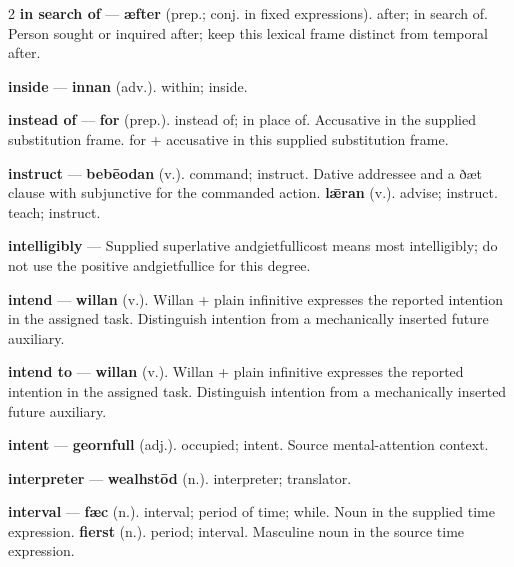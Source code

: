 \begin{multicols}{2}
\textbf{in search of} — \textbf{æfter} (prep.; conj. in fixed expressions). after; in search of. Person sought or inquired after; keep this lexical frame distinct from temporal after.\par
\textbf{inside} — \textbf{innan} (adv.). within; inside.\par
\textbf{instead of} — \textbf{for} (prep.). instead of; in place of. Accusative in the supplied substitution frame. for + accusative in this supplied substitution frame.\par
\textbf{instruct} — \textbf{bebēodan} (v.). command; instruct. Dative addressee and a ðæt clause with subjunctive for the commanded action. \textbf{lǣran} (v.). advise; instruct. teach; instruct.\par
\textbf{intelligibly} — Supplied superlative andgietfullicost means most intelligibly; do not use the positive andgietfullice for this degree.\par
\textbf{intend} — \textbf{willan} (v.). Willan + plain infinitive expresses the reported intention in the assigned task. Distinguish intention from a mechanically inserted future auxiliary.\par
\textbf{intend to} — \textbf{willan} (v.). Willan + plain infinitive expresses the reported intention in the assigned task. Distinguish intention from a mechanically inserted future auxiliary.\par
\textbf{intent} — \textbf{geornfull} (adj.). occupied; intent. Source mental-attention context.\par
\textbf{interpreter} — \textbf{wealhstōd} (n.). interpreter; translator.\par
\textbf{interval} — \textbf{fæc} (n.). interval; period of time; while. Noun in the supplied time expression. \textbf{fierst} (n.). period; interval. Masculine noun in the source time expression.\par

\end{multicols}
